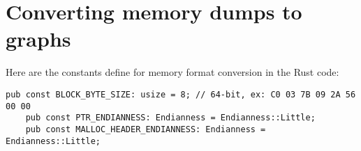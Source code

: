 \chapter{Converting memory dumps to graphs}\label{chap:mem_2_graph}

\begin{minipage}{\dimexpr\linewidth-20pt}
    Here are the constants define for memory format conversion in the Rust code:

   \begin{lstlisting}[style=rust, caption={Rust memory format constants in \textit{mem2graph}}]
    pub const BLOCK_BYTE_SIZE: usize = 8; // 64-bit, ex: C0 03 7B 09 2A 56 00 00
    pub const PTR_ENDIANNESS: Endianness = Endianness::Little;
    pub const MALLOC_HEADER_ENDIANNESS: Endianness = Endianness::Little;
   \end{lstlisting}
\end{minipage}